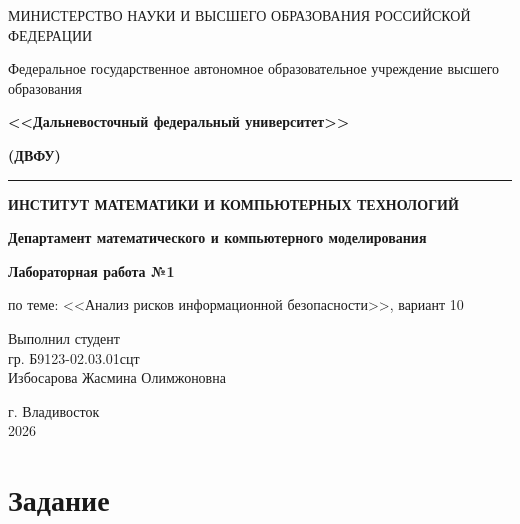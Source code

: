 \documentclass[a4paper,14pt]{extarticle}
\begin{document}
\begin{titlepage}
\begin{center}

\small
МИНИСТЕРСТВО НАУКИ И ВЫСШЕГО ОБРАЗОВАНИЯ РОССИЙСКОЙ ФЕДЕРАЦИИ

\smallskip
Федеральное государственное автономное образовательное учреждение высшего образования

\smallskip
\textbf{<<Дальневосточный федеральный университет>>}

\textbf{(ДВФУ)}

\vspace{5mm}
\noindent\rule{\textwidth}{2pt}

\vspace{10mm}
{\large\textbf{ИНСТИТУТ МАТЕМАТИКИ И КОМПЬЮТЕРНЫХ ТЕХНОЛОГИЙ}}



\vspace{5mm}
\textbf{Департамент математического и компьютерного моделирования}

\vspace{15mm}
{\large\textbf{Лабораторная работа №1}}

\vspace{5mm}
по теме: <<Анализ рисков информационной безопасности>>, вариант 10

\end{center}

\vspace{30mm}

\begin{flushright}
Выполнил студент\\
гр. Б9123-02.03.01сцт\\
Избосарова Жасмина Олимжоновна
\end{flushright}

\vfill

\begin{center}
г. Владивосток\\
2026
\end{center}

\end{titlepage}

\tableofcontents
\newpage

\section*{Задание}
\end{document}
